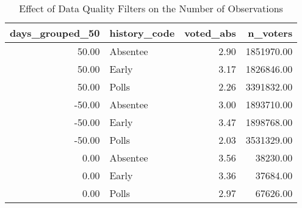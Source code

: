 \begin{table}[!htb]
\centering
\caption{Effect of Data Quality Filters on the Number of Observations} 
\label{table:tab13}
\begingroup\small
\begin{tabular}{rlrr}
  \hline
days_grouped_50 & history_code & voted_abs & n_voters \\ 
  \hline
50.00 & Absentee & 2.90 & 1851970.00 \\ 
  50.00 & Early & 3.17 & 1826846.00 \\ 
  50.00 & Polls & 2.26 & 3391832.00 \\ 
  -50.00 & Absentee & 3.00 & 1893710.00 \\ 
  -50.00 & Early & 3.47 & 1898768.00 \\ 
  -50.00 & Polls & 2.03 & 3531329.00 \\ 
  0.00 & Absentee & 3.56 & 38230.00 \\ 
  0.00 & Early & 3.36 & 37684.00 \\ 
  0.00 & Polls & 2.97 & 67626.00 \\ 
   \hline
\end{tabular}
\endgroup
\end{table}
